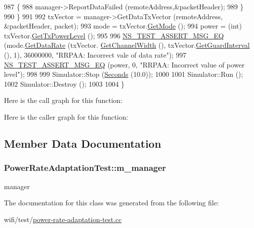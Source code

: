 \begin{DoxyCode}
987         \{
988           manager->ReportDataFailed (remoteAddress,&packetHeader);
989         \}
990     \}
991 
992   txVector = manager->GetDataTxVector (remoteAddress, &packetHeader, packet);
993   mode = txVector.\hyperlink{classns3_1_1WifiTxVector_a497b1f11cad4b8b26251dfa07c9ad1d6}{GetMode} ();
994   power = (int) txVector.\hyperlink{classns3_1_1WifiTxVector_a7c98bd9609ff1c5cefa6e22d6908a2fe}{GetTxPowerLevel} ();
995 
996   \hyperlink{group__testing_ga2a9d78cffb3db8e867c35fff0b698cf5}{NS\_TEST\_ASSERT\_MSG\_EQ} (mode.\hyperlink{classns3_1_1WifiMode_adcfbe150f69da720db23387f733b8a52}{GetDataRate} (txVector.
      \hyperlink{classns3_1_1WifiTxVector_a1f8bfa51778a3e217581eb665f059564}{GetChannelWidth} (), txVector.\hyperlink{classns3_1_1WifiTxVector_ab80c0fd812542ef337a6cace4f64db63}{GetGuardInterval} (), 1), 36000000, \textcolor{stringliteral}{"RRPAA:
       Incorrect vale of data rate"});
997   \hyperlink{group__testing_ga2a9d78cffb3db8e867c35fff0b698cf5}{NS\_TEST\_ASSERT\_MSG\_EQ} (power, 0, \textcolor{stringliteral}{"RRPAA: Incorrect value of power level"});
998 
999   Simulator::Stop (\hyperlink{group__timecivil_ga33c34b816f8ff6628e33d5c8e9713b9e}{Seconds} (10.0));
1000 
1001   Simulator::Run ();
1002   Simulator::Destroy ();
1003 
1004 \}
\end{DoxyCode}


Here is the call graph for this function\+:




Here is the caller graph for this function\+:




\subsection{Member Data Documentation}
\subsubsection[{\texorpdfstring{m\+\_\+manager}{m_manager}}]{ Power\+Rate\+Adaptation\+Test\+::m\+\_\+manager\hspace{0.3cm}{\ttfamily [private]}}\hypertarget{classPowerRateAdaptationTest_afa9f7fb131c12b88efa24138930c50b3}{}\label{classPowerRateAdaptationTest_afa9f7fb131c12b88efa24138930c50b3}


manager 



The documentation for this class was generated from the following file\+:\begin{DoxyCompactItemize}
\item 
wifi/test/\hyperlink{power-rate-adaptation-test_8cc}{power-\/rate-\/adaptation-\/test.\+cc}\end{DoxyCompactItemize}
